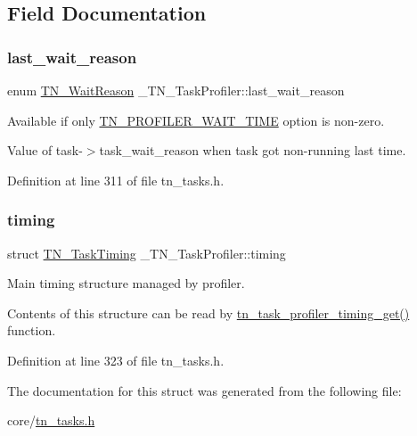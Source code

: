 \subsection{Field Documentation}
\mbox{\label{struct__TN__TaskProfiler_aa587d29f8b4a5252547dc3144735ea55}} 
\subsubsection{\texorpdfstring{last\+\_\+wait\+\_\+reason}{last\_wait\_reason}}
{\footnotesize\ttfamily enum \hyperlink{tn__tasks_8h_a343b0332013c15d6e878c2f60ed2c9b7}{T\+N\+\_\+\+Wait\+Reason} \+\_\+\+T\+N\+\_\+\+Task\+Profiler\+::last\+\_\+wait\+\_\+reason}



Available if only {\ttfamily \hyperlink{tn__cfg__default_8h_a1c04db5457adb54f7cc38d42b29a5ad7}{T\+N\+\_\+\+P\+R\+O\+F\+I\+L\+E\+R\+\_\+\+W\+A\+I\+T\+\_\+\+T\+I\+ME}} option is non-\/zero. 

Value of {\ttfamily task-\/$>$task\+\_\+wait\+\_\+reason} when task got non-\/running last time. 

Definition at line 311 of file tn\+\_\+tasks.\+h.

\mbox{\label{struct__TN__TaskProfiler_a49e7b961e080414f407f5c52f9688ed5}} 
\subsubsection{\texorpdfstring{timing}{timing}}
{\footnotesize\ttfamily struct \hyperlink{structTN__TaskTiming}{T\+N\+\_\+\+Task\+Timing} \+\_\+\+T\+N\+\_\+\+Task\+Profiler\+::timing}



Main timing structure managed by profiler. 

Contents of this structure can be read by {\ttfamily \hyperlink{tn__tasks_8h_a8f90a88f54d2d49bb1de00886241edfe}{tn\+\_\+task\+\_\+profiler\+\_\+timing\+\_\+get()}} function. 

Definition at line 323 of file tn\+\_\+tasks.\+h.



The documentation for this struct was generated from the following file\+:\begin{DoxyCompactItemize}
\item 
core/\hyperlink{tn__tasks_8h}{tn\+\_\+tasks.\+h}\end{DoxyCompactItemize}
